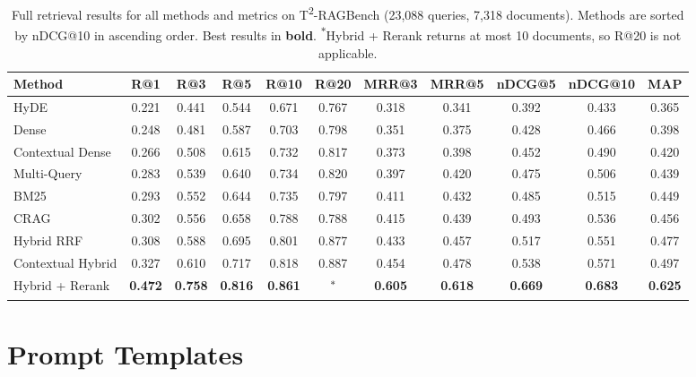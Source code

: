 \documentclass[11pt]{article}
\begin{document}
\begin{table}[ht]
\centering
\small
\setlength{\tabcolsep}{4.5pt}
\begin{tabular}{lcccccccccc}
\toprule
\textbf{Method} & \textbf{R@1} & \textbf{R@3} & \textbf{R@5} & \textbf{R@10} & \textbf{R@20} & \textbf{MRR@3} & \textbf{MRR@5} & \textbf{nDCG@5} & \textbf{nDCG@10} & \textbf{MAP} \\
\midrule
HyDE              & 0.221 & 0.441 & 0.544 & 0.671 & 0.767 & 0.318 & 0.341 & 0.392 & 0.433 & 0.365 \\
Dense             & 0.248 & 0.481 & 0.587 & 0.703 & 0.798 & 0.351 & 0.375 & 0.428 & 0.466 & 0.398 \\
Contextual Dense  & 0.266 & 0.508 & 0.615 & 0.732 & 0.817 & 0.373 & 0.398 & 0.452 & 0.490 & 0.420 \\
Multi-Query       & 0.283 & 0.539 & 0.640 & 0.734 & 0.820 & 0.397 & 0.420 & 0.475 & 0.506 & 0.439 \\
BM25              & 0.293 & 0.552 & 0.644 & 0.735 & 0.797 & 0.411 & 0.432 & 0.485 & 0.515 & 0.449 \\
CRAG              & 0.302 & 0.556 & 0.658 & 0.788 & 0.788 & 0.415 & 0.439 & 0.493 & 0.536 & 0.456 \\
Hybrid RRF        & 0.308 & 0.588 & 0.695 & 0.801 & 0.877 & 0.433 & 0.457 & 0.517 & 0.551 & 0.477 \\
Contextual Hybrid & 0.327 & 0.610 & 0.717 & 0.818 & 0.887 & 0.454 & 0.478 & 0.538 & 0.571 & 0.497 \\
Hybrid + Rerank   & \textbf{0.472} & \textbf{0.758} & \textbf{0.816} & \textbf{0.861} & \textsuperscript{$\ast$} & \textbf{0.605} & \textbf{0.618} & \textbf{0.669} & \textbf{0.683} & \textbf{0.625} \\
\bottomrule
\end{tabular}
\caption{Full retrieval results for all methods and metrics on T\textsuperscript{2}-RAGBench (23,088 queries, 7,318 documents). Methods are sorted by nDCG@10 in ascending order. Best results in \textbf{bold}. \textsuperscript{$\ast$}Hybrid + Rerank returns at most 10 documents, so R@20 is not applicable.}
\label{tab:full_results}
\end{table}


\section{Prompt Templates}
\label{app:prompts}
\end{document}
